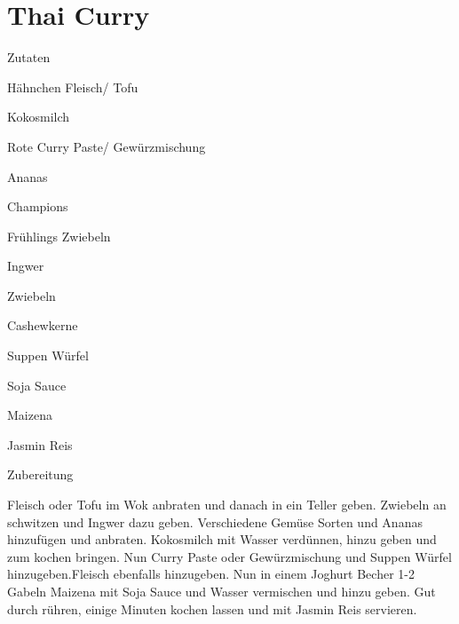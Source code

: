 \chapter*{Thai Curry}
\begin{multicols}{2}
 {\Large Zutaten}
 \begin{Zutaten}
		\item Hähnchen Fleisch/ Tofu
		\item Kokosmilch
		\item Rote Curry Paste/ Gewürzmischung
		\item Ananas
		\item Champions
		\item Frühlings Zwiebeln
		\item Ingwer
		\item Zwiebeln
		\item Cashewkerne
		\item Suppen Würfel
		\item Soja Sauce
		\item Maizena
		\item Jasmin Reis
		
		
\end{Zutaten}
\columnbreak
\end{multicols}

{\Large Zubereitung} \newline
\begin{addmargin}[1cm]{0cm}
	Fleisch oder Tofu im Wok anbraten und danach in ein Teller geben.\newline
	Zwiebeln an schwitzen und Ingwer dazu geben. Verschiedene Gemüse Sorten und Ananas hinzufügen und
	anbraten.\newline
	Kokosmilch mit Wasser verdünnen, hinzu geben und zum kochen bringen. Nun Curry Paste oder
	Gewürzmischung und Suppen Würfel hinzugeben.\newline Fleisch ebenfalls hinzugeben.\newline
	Nun in einem Joghurt Becher 1-2 Gabeln Maizena mit Soja Sauce und Wasser vermischen und hinzu geben.\newline
	Gut durch rühren, einige Minuten kochen lassen und mit Jasmin Reis servieren.
	
	
	
	
	
	
\end{addmargin}

